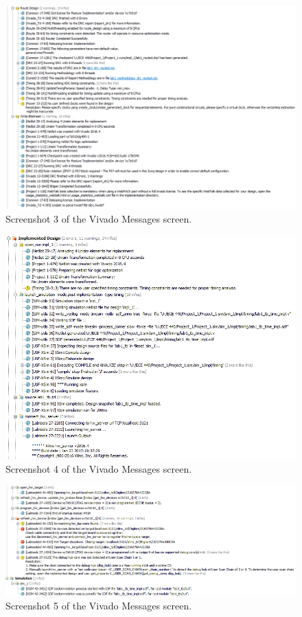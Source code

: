 \documentclass[a4paper, 12pt]{article}
\begin{document}
\begin{figure}[H]
\centering
\includegraphics[width=1\textwidth]{vivado_messages3.PNG}
\caption{Screenshot 3 of the Vivado Messages screen.}
\label{fig:img00}
\end{figure}

\begin{figure}[H]
\centering
\includegraphics[width=1\textwidth]{vivado_messages4.PNG}
\caption{Screenshot 4 of the Vivado Messages screen.}
\label{fig:img00}
\end{figure}

\begin{figure}[H]
\centering
\includegraphics[width=1\textwidth]{vivado_messages5.PNG}
\caption{Screenshot 5 of the Vivado Messages screen.}
\label{fig:img00}
\end{figure}
\end{document}
